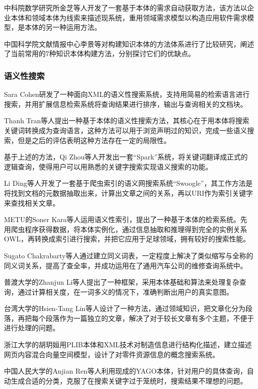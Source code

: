 \documentclass[12pt,a4paper]{article}
\begin{document}
	中科院数学研究所金芝等人开发了一套基于本体的需求自动获取方法，该方法以企业本体和领域本体为线索来描述现系统，重用领域需求模型以构造应用软件需求模型\cite{10}，是本体的另一种运用方法。
	
	中国科学院文献情报中心李景等对构建知识本体的方法体系进行了比较研究，阐述了当前常用的7种知识本体构建方法，分别探讨它们的优缺点\cite{11}。
	
		\subsubsection*{语义性搜索}
	{\Times Sara Cohen}研发了一种面向XML的语义性搜索系统，支持用简易的检索语言进行搜索，并用扩展信息检索系统将查询结果进行排序，输出与查询相关的文档块\cite{12}。

	{\Times Thanh Tran}等人提出一种基于本体的语义性搜索方法，其核心在于用本体将搜索关键词转换成为查询语言，这种方法可以用于浏览声明过的知识，完成一些语义搜索\cite{13}，但是之后的评估表明这种方法存在一定的局限性。

	基于上述的方法，{\Times Qi Zhou}等人开发出一套“{\Times Spark}”系统，将关键词翻译成正式的逻辑查询，使得用户可以用熟悉的关键字搜索实现语义搜索的功能\cite{14}。

	{\Times Li Ding}等人开发了一套基于爬虫索引的语义网搜索系统“{\Times Swoogle}”，其工作方法是将找到文档的元数据抽取出来，计算出文章之间的关系，再以{\Times URI}作为索引关键字来查找相关文章\cite{15}。

	{\Times METU}的{\Times Soner Kara}等人运用语义性索引，提出了一种基于本体的检索系统。先用爬虫程序获得数据，将本体实例化，通过信息抽取和推理得到完全的实例关系{\Times OWL}，再转换成索引进行搜索，并把它应用于足球领域\cite{16}，拥有较好的搜索性能。

	{\Times Sugato Chakrabarty}等人通过建立同义词表，一定程度上解决了类似缩写与全称的同义词关系，提高了查全率，并成功运用在了通用汽车公司的维修查询系统中\cite{17}。

	普渡大学的{\Times Zhanjun Li}等人提出了一种框架，采用本体基础和算法来处理复杂查询，通过计算相关度，在一词多义的情况下，准确判断出用户的真实意图\cite{18}。

	台湾大学的{\Times Hsien-Tang Lin}等人设计了一种方法，通过领域知识，把文章化分为段落，再把每个段落作为一篇独立的文章，解决了对于较长文章有多个主题，不便于进行处理的问题\cite{19}。

	浙江大学的胡玥姮用{\Times PLIB}本体和{\Times XML}技术对制造信息进行结构化描述，建立描述网页内容混合向量空间模型，设计了对零件资源信息的概念搜索系统。

	中国人民大学的{\Times Anjian Ren}等人利用现成的{\Times YAGO}本体，针对用户的具体查询，自动生成合适的分类，克服了在搜索关键字过于笼统时，搜索结果不理想的问题\cite{20}。
\end{document}
